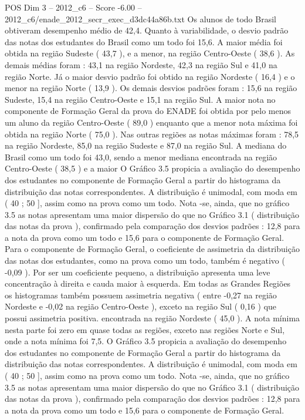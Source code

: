 \begin{textsample}{POS Dim 3 – 2012\_c6 – Score -6.00 – 2012\_c6/enade\_2012\_secr\_exec\_d3dc44a86b.txt}
Os alunos de todo Brasil obtiveram desempenho médio de 42,4.
Quanto à variabilidade, o desvio padrão das notas dos estudantes do Brasil como um todo foi 15,6.
A maior média foi obtida na região Sudeste ( 43,7 ), e a menor, na região Centro-Oeste ( 38,6 ).
As demais médias foram : 43,1 na região Nordeste, 42,3 na região Sul e 41,0 na região Norte.
Já o maior desvio padrão foi obtido na região Nordeste ( 16,4 ) e o menor na região Norte ( 13,9 ).
Os demais desvios padrões foram : 15,6 na região Sudeste, 15,4 na região Centro-Oeste e 15,1 na região Sul.
A maior nota no componente de Formação Geral da prova do ENADE foi obtida por pelo menos um aluno da região Centro-Oeste ( 89,0 ) enquanto que a menor nota máxima foi obtida na região Norte ( 75,0 ).
Nas outras regiões as notas máximas foram : 78,5 na região Nordeste, 85,0 na região Sudeste e 87,0 na região Sul.
A mediana do Brasil como um todo foi 43,0, sendo a menor mediana encontrada na região Centro-Oeste ( 38,5 ) e a maior O Gráfico 3.5 propicia a avaliação do desempenho dos estudantes no componente de Formação Geral a partir do histograma da distribuição das notas correspondentes.
A distribuição é unimodal, com moda em ( 40 ; 50 ], assim como na prova como um todo.
Nota -se, ainda, que no gráfico 3.5 as notas apresentam uma maior dispersão do que no Gráfico 3.1 ( distribuição das notas da prova ), confirmado pela comparação dos desvios padrões : 12,8 para a nota da prova como um todo e 15,6 para o componente de Formação Geral.
Para o componente de Formação Geral, o coeficiente de assimetria da distribuição das notas dos estudantes, como na prova como um todo, também é negativo ( -0,09 ).
Por ser um coeficiente pequeno, a distribuição apresenta uma leve concentração à direita e cauda maior à esquerda.
Em todas as Grandes Regiões os histogramas também possuem assimetria negativa ( entre -0,27 na região Nordeste e -0,02 na região Centro-Oeste ), exceto na região Sul ( 0,16 ) que possui assimetria positiva. encontrada na região Nordeste ( 45,0 ).
A nota mínima nesta parte foi zero em quase todas as regiões, exceto nas regiões Norte e Sul, onde a nota mínima foi 7,5.
O Gráfico 3.5 propicia a avaliação do desempenho dos estudantes no componente de Formação Geral a partir do histograma da distribuição das notas correspondentes.
A distribuição é unimodal, com moda em ( 40 ; 50 ], assim como na prova como um todo.
Nota -se, ainda, que no gráfico 3.5 as notas apresentam uma maior dispersão do que no Gráfico 3.1 ( distribuição das notas da prova ), confirmado pela comparação dos desvios padrões : 12,8 para a nota da prova como um todo e 15,6 para o componente de Formação Geral.

\end{textsample}
